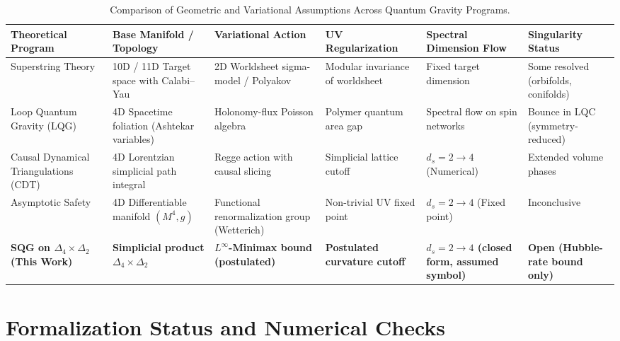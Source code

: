 \documentclass[11pt,a4paper,reqno]{amsart}
\theoremstyle{definition}
\numberwithin{equation}{section}
\begin{document}
\begin{table}[htbp]
\centering
\footnotesize
\renewcommand{\arraystretch}{1.25}
\caption{Comparison of Geometric and Variational Assumptions Across Quantum Gravity Programs.}
\label{tab:scorecard}
\begin{tabularx}{\textwidth}{@{} >{\raggedright\arraybackslash}X >{\centering\arraybackslash}p{2.3cm} >{\centering\arraybackslash}p{2.0cm} >{\centering\arraybackslash}p{2.2cm} >{\centering\arraybackslash}p{2.2cm} >{\centering\arraybackslash}p{1.9cm} @{}}
\toprule
\textbf{Theoretical Program} & \textbf{Base Manifold / Topology} & \textbf{Variational Action} & \textbf{UV Regularization} & \textbf{Spectral Dimension Flow} & \textbf{Singularity Status} \\
\midrule
Superstring Theory & 10D / 11D Target space with Calabi--Yau & 2D Worldsheet sigma-model / Polyakov & Modular invariance of worldsheet & Fixed target dimension & Some resolved (orbifolds, conifolds) \\
Loop Quantum Gravity (LQG) & 4D Spacetime foliation (Ashtekar variables) & Holonomy-flux Poisson algebra & Polymer quantum area gap & Spectral flow on spin networks & Bounce in LQC (symmetry-reduced) \\
Causal Dynamical Triangulations (CDT) & 4D Lorentzian simplicial path integral & Regge action with causal slicing & Simplicial lattice cutoff & $d_s = 2 \to 4$ (Numerical) & Extended volume phases \\
Asymptotic Safety & 4D Differentiable manifold $(M^4, g)$ & Functional renormalization group (Wetterich) & Non-trivial UV fixed point & $d_s = 2 \to 4$ (Fixed point) & Inconclusive \\
\midrule
\textbf{SQG on $\Delta_4 \times \Delta_2$ (This Work)} & \textbf{Simplicial product $\Delta_4 \times \Delta_2$} & \textbf{$L^\infty$-Minimax bound (postulated)} & \textbf{Postulated curvature cutoff} & \textbf{$d_s = 2 \to 4$ (closed form, assumed symbol)} & \textbf{Open (Hubble-rate bound only)} \\
\bottomrule
\end{tabularx}
\end{table}

\section{Formalization Status and Numerical Checks}
\label{sec:lean4_verification}
\end{document}
